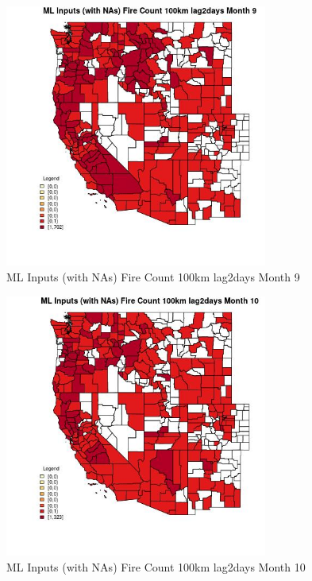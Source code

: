 \begin{figure} 
\centering  
\includegraphics[width=0.77\textwidth]{Code_Outputs/Report_ML_input_PM25_Step4_part_e_de_duplicated_aves_compiled_2019-05-21wNAs_CountyFire_Count_100km_lag2daysmedianMonth9.jpg} 
\caption{\label{fig:Report_ML_input_PM25_Step4_part_e_de_duplicated_aves_compiled_2019-05-21wNAsCountyFire_Count_100km_lag2daysmedianMonth9}ML Inputs (with NAs) Fire Count 100km lag2days Month 9} 
\end{figure} 
 

\begin{figure} 
\centering  
\includegraphics[width=0.77\textwidth]{Code_Outputs/Report_ML_input_PM25_Step4_part_e_de_duplicated_aves_compiled_2019-05-21wNAs_CountyFire_Count_100km_lag2daysmedianMonth10.jpg} 
\caption{\label{fig:Report_ML_input_PM25_Step4_part_e_de_duplicated_aves_compiled_2019-05-21wNAsCountyFire_Count_100km_lag2daysmedianMonth10}ML Inputs (with NAs) Fire Count 100km lag2days Month 10} 
\end{figure} 
 


